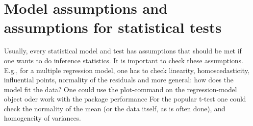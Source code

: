 \documentclass[12pt,a4paper]{article}
\begin{document}
\section{Model assumptions and assumptions for statistical tests}
Usually, every statistical model and test has assumptions that should be met if one wants to do inference statistics. It is important to check these assumptions. E.g., for a multiple regression model, one has to check linearity, homoscedasticity, influential points, normality of the residuals and more general: how does the model fit the data?
One could use the plot-command on the regression-model object oder work with the package performance 
For the popular t-test one could check the normality of the mean (or the data itself, as is often done), and homogeneity of variances.

\newpage


%
%

\end{document}
